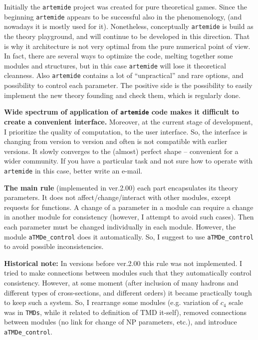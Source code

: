 \documentclass[prd,nofootinbib,eqsecnum,final]{revtex4}
\renewcommand{\(}{\left(}
\renewcommand{\)}{\right)}
\renewcommand{\[}{\left[}
\renewcommand{\]}{\right]}
\begin{document}
Initially the \texttt{artemide} project was created for pure theoretical games. Since the beginning \texttt{artemide} appears to be successful also in the phenomenology, (and nowadays it is mostly used for it). Nonetheless, conceptually \texttt{artemide} is build as the theory playground, and will continue to be developed in this direction.  That is why it architecture is not very optimal from the pure numerical point of view. In fact, there are several ways to optimize the code, melting together some modules and structures, but in this case \texttt{artemide} will lose it theoretical cleanness. Also \texttt{artemide} contains a lot of ``unpractical'' and rare options, and possibility to control each parameter. The positive side is the possibility to easily implement the new theory founding and check them, which is regularly done.

\textbf{Wide spectrum of application of \texttt{artemide} code makes it difficult to create a convenient interface.} Moreover, at the current stage of development, I prioritize the quality of computation, to the user interface. So, the interface is changing from version to version and often is not compatible with earlier versions. It slowly converges to the (almost) perfect shape -- convenient for a wider community. If you have a particular task and not sure how to operate with \texttt{artemide} in this case, better write an e-mail.

\begin{tcolorbox}
\textbf{The main rule} (implemented in ver.2.00) each part encapsulates its theory parameters. It does not affect/change/interact with other modules, except requests for functions. A change of a parameter in a module can require a change in another module for consistency (however, I attempt to avoid such cases). Then each parameter must be changed individually in each module. However, the module \texttt{aTMDe\_control} does it automatically. So, I suggest to use \texttt{aTMDe\_control} to avoid possible inconsistencies.
\end{tcolorbox}
\textbf{Historical note:} In versions before ver.2.00 this rule was not implemented. I tried to make connections between modules such that they automatically control consistency. However, at some moment (after inclusion of many hadrons and different types of cross-sections, and different orders) it became practically tough to keep such a system. So, I rearrange some modules (e.g. variation of $c_4$ scale was in \texttt{TMDs}, while it related to definition of TMD it-self), removed connections between modules (no link for change of NP parameters, etc.), and introduce \texttt{aTMDe\_control}.
\end{document}
